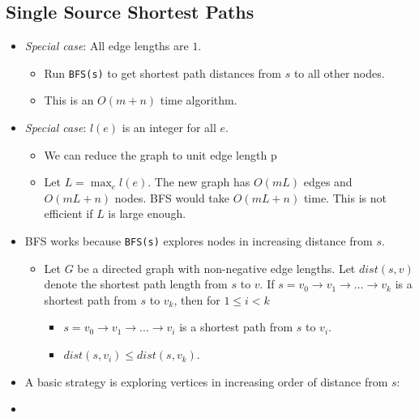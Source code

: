 \subsection{Single Source Shortest Paths}
\begin{itemize}
    \item \textit{Special case}: All edge lengths are $1$.
    \begin{itemize}
        \item Run \texttt{BFS(s)} to get shortest path distances from $s$ to all other nodes.
        \item This is an $O(m + n)$ time algorithm.
    \end{itemize}
    \item \textit{Special case}: $l(e)$ is an integer for all $e$.
    \begin{itemize}
        \item We can reduce the graph to unit edge length p
        \item Let $L = \max_e l(e)$. The new graph has $O(mL)$ edges and $O(mL + n)$ nodes. BFS would take $O(mL + n)$ time. This is not efficient if $L$ is large enough.
    \end{itemize}
    \item BFS works because \texttt{BFS(s)} explores nodes in increasing distance from $s$.
    \begin{itemize}
        \item Let $G$ be a directed graph with non-negative edge lengths. Let $dist(s, v)$ denote the shortest path length from $s$ to $v$. If $s = v_0 \rightarrow v_1 \rightarrow ... \rightarrow v_k$ is a shortest path from $s$ to $v_k$, then for $1 \leq i < k$
        \begin{itemize}
            \item $s = v_0 \rightarrow v_1 \rightarrow ... \rightarrow v_i$ is a shortest path from $s$ to $v_i$.
            \item $dist(s, v_i) \leq dist(s, v_k)$.
        \end{itemize}
    \end{itemize}
    \item A basic strategy is exploring vertices in increasing order of distance from $s$:
    \item[] 
\end{itemize}

